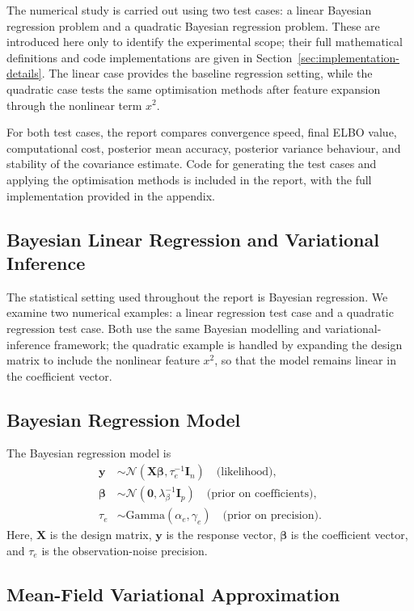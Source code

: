 \documentclass[11pt,a4paper]{article}
\newcommand{\N}{\mathcal{N}}
\begin{document}
The numerical study is carried out using two test cases: a linear Bayesian regression problem and a quadratic Bayesian regression problem. These are introduced here only to identify the experimental scope; their full mathematical definitions and code implementations are given in Section~\ref{sec:implementation-details}. The linear case provides the baseline regression setting, while the quadratic case tests the same optimisation methods after feature expansion through the nonlinear term $x^2$.

For both test cases, the report compares convergence speed, final ELBO value, computational cost, posterior mean accuracy, posterior variance behaviour, and stability of the covariance estimate. Code for generating the test cases and applying the optimisation methods is included in the report, with the full implementation provided in the appendix.

\subsection{Bayesian Linear Regression and Variational Inference}

The statistical setting used throughout the report is Bayesian regression. We examine two numerical examples: a linear regression test case and a quadratic regression test case. Both use the same Bayesian modelling and variational-inference framework; the quadratic example is handled by expanding the design matrix to include the nonlinear feature $x^2$, so that the model remains linear in the coefficient vector.

\subsection{Bayesian Regression Model}

The Bayesian regression model is
\begin{align}
\bm{y} &\sim \N(\bm{X}\bm{\beta}, \tau_e^{-1} \bm{I}_n) \quad \text{(likelihood)},\\
\bm{\beta} &\sim \N(\bm{0}, \lambda_\beta^{-1} \bm{I}_p) \quad \text{(prior on coefficients)},\\
\tau_e &\sim \text{Gamma}(\alpha_e, \gamma_e) \quad \text{(prior on precision)}.
\end{align}
Here, $\bm{X}$ is the design matrix, $\bm{y}$ is the response vector, $\bm{\beta}$ is the coefficient vector, and $\tau_e$ is the observation-noise precision.

\subsection{Mean-Field Variational Approximation}
\end{document}
